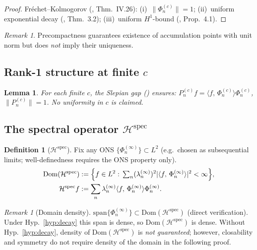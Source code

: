 \documentclass[12pt,a4paper]{amsart}
\newtheorem{lemma}[theorem]{Lemma}
\theoremstyle{definition}
\newtheorem{definition}[theorem]{Definition}
\theoremstyle{remark}
\newtheorem{remark}[theorem]{Remark}
\newcommand{\ip}[2]{\langle #1,\, #2\rangle}
\newcommand{\Hspec}{\mathcal{H}^{\mathrm{spec}}}
\newcommand{\Dom}{\mathrm{Dom}}
\begin{document}
\begin{proof}
Fr\'echet--Kolmogorov (\cite{ReedSimon1975}, Thm.~IV.26):
(i)~$\|\Phi_n^{(c)}\|=1$;
(ii)~uniform exponential decay (\cite{Osipov2013},
Thm.~3.2);
(iii)~uniform $H^1$-bound (\cite{Osipov2013},
Prop.~4.1).
\end{proof}

\begin{remark}
Precompactness guarantees existence of accumulation
points with unit norm but does \emph{not} imply their
uniqueness.
\end{remark}

\subsection{Rank-1 structure at finite $c$}

\begin{lemma}
\label{lem:rank1}
For each finite $c$, the Slepian gap
(\cite{Slepian1961}) ensures:
$P_n^{(c)}f=\ip{f}{\Phi_n^{(c)}}\Phi_n^{(c)}$,
$\|P_n^{(c)}\|=1$.
No uniformity in $c$ is claimed.
\end{lemma}

\subsection{The spectral operator $\Hspec$}

\begin{definition}[$\Hspec$]
\label{def:domain}
Fix any ONS $\{\Phi_n^{(\infty)}\}\subset L^2$
(e.g.\ chosen as subsequential limits;
well-definedness requires the ONS property only).
\begin{align*}
  \Dom(\Hspec)&:=\Bigl\{f\in L^2:\,
  {\textstyle\sum_n}(\lambda_n^{(\infty)})^2
  |\ip{f}{\Phi_n^{(\infty)}}|^2<\infty\Bigr\},\\
  \Hspec f&:=\sum_n\lambda_n^{(\infty)}
  \ip{f}{\Phi_n^{(\infty)}}\Phi_n^{(\infty)}.
\end{align*}
\end{definition}

\begin{remark}[Domain density]
\label{rem:domain-density}
$\mathrm{span}\{\Phi_n^{(\infty)}\}\subset\Dom(\Hspec)$
(direct verification).
Under Hyp.~\ref{hyp:decay} this span is dense,
so $\Dom(\Hspec)$ is dense.
Without Hyp.~\ref{hyp:decay}, density of
$\Dom(\Hspec)$ is \emph{not guaranteed};
however, closability and symmetry do not require
density of the domain in the following proof.
\end{remark}
\end{document}
